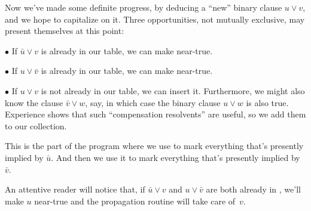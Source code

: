 Now we've made some definite progress, by deducing a
``new'' binary
clause $u\lor v$, and we hope to capitalize on it. Three
opportunities, not mutually exclusive, may present themselves at this point:
\smallskip
\item{$\bullet$}
If $\bar u\lor v$ is already in our  table, we can make 
near-true.
\smallskip
\item{$\bullet$}
If $u\lor\bar v$ is already in our  table, we can make 
near-true.
\smallskip
\item{$\bullet$}
If $u\lor v$ is not already in our  table, we can insert it.
\smallskip\noindent
Furthermore, we might also know the clause $\bar v\lor w$, say, in which case
the binary clause $u\lor w$ is also true. Experience shows that such
``compensation resolvents'' are useful, so we add them to our 
collection.

This is the part of the program where we use  to mark everything
that's presently implied by $\bar u$. And then we use it to mark everything
that's presently implied by $\bar v$.

An attentive reader will notice that, if $\bar u\lor v$ and $u\lor\bar v$
are both already in , we'll make $u$ near-true and the propagation
routine will take care of~$v$.

